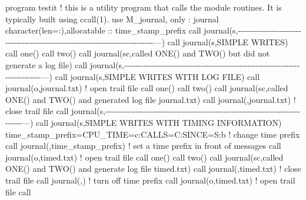 program testit ! this is a utility program that calls the module routines. It is typically built using ccall(1). use M\+\_\+journal, only \+: journal character(len=\+:),allocatable \+:\+: time\+\_\+stamp\+\_\+prefix call journal(\textquotesingle{}s\textquotesingle{},\textquotesingle{}-\/-\/-\/-\/-\/-\/-\/-\/-\/-\/-\/-\/-\/-\/-\/-\/-\/-\/-\/-\/-\/-\/-\/-\/-\/-\/-\/-\/-\/-\/-\/-\/-\/-\/-\/-\/-\/-\/-\/-\/-\/-\/-\/-\/-\/-\/-\/-\/-\/-\/-\/-\/-\/-\/-\/-\/-\/-\/-\/-\/-\/-\/-\/-\/-\/-\/-\/-\/-\/-\/-\/-\/-\/-\/-\/-\/-\/---\textquotesingle{}) call journal(\textquotesingle{}s\textquotesingle{},\textquotesingle{}S\+I\+M\+P\+LE W\+R\+I\+T\+ES\textquotesingle{}) call one() call two() call journal(\textquotesingle{}sc\textquotesingle{},\textquotesingle{}called O\+N\+E() and T\+W\+O() but did not generate a log file\textquotesingle{}) call journal(\textquotesingle{}s\textquotesingle{},\textquotesingle{}-\/-\/-\/-\/-\/-\/-\/-\/-\/-\/-\/-\/-\/-\/-\/-\/-\/-\/-\/-\/-\/-\/-\/-\/-\/-\/-\/-\/-\/-\/-\/-\/-\/-\/-\/-\/-\/-\/-\/-\/-\/-\/-\/-\/-\/-\/-\/-\/-\/-\/-\/-\/-\/-\/-\/-\/-\/-\/-\/-\/-\/-\/-\/-\/-\/-\/-\/-\/-\/-\/-\/-\/-\/-\/-\/-\/-\/---\textquotesingle{}) call journal(\textquotesingle{}s\textquotesingle{},\textquotesingle{}S\+I\+M\+P\+LE W\+R\+I\+T\+ES W\+I\+TH L\+OG F\+I\+LE\textquotesingle{}) call journal(\textquotesingle{}o\textquotesingle{},\textquotesingle{}journal.\+txt\textquotesingle{}) ! open trail file call one() call two() call journal(\textquotesingle{}sc\textquotesingle{},\textquotesingle{}called O\+N\+E() and T\+W\+O() and generated log file journal.\+txt\textquotesingle{}) call journal(\textquotesingle{}\textquotesingle{},\textquotesingle{}journal.\+txt\textquotesingle{}) ! close trail file call journal(\textquotesingle{}s\textquotesingle{},\textquotesingle{}-\/-\/-\/-\/-\/-\/-\/-\/-\/-\/-\/-\/-\/-\/-\/-\/-\/-\/-\/-\/-\/-\/-\/-\/-\/-\/-\/-\/-\/-\/-\/-\/-\/-\/-\/-\/-\/-\/-\/-\/-\/-\/-\/-\/-\/-\/-\/-\/-\/-\/-\/-\/-\/-\/-\/-\/-\/-\/-\/-\/-\/-\/-\/-\/-\/-\/-\/-\/-\/-\/-\/-\/-\/-\/-\/-\/-\/---\textquotesingle{}) call journal(\textquotesingle{}s\textquotesingle{},\textquotesingle{}S\+I\+M\+P\+LE W\+R\+I\+T\+ES W\+I\+TH T\+I\+M\+I\+NG I\+N\+F\+O\+R\+M\+A\+T\+I\+ON\textquotesingle{}) time\+\_\+stamp\+\_\+prefix=\textquotesingle{}C\+P\+U\+\_\+\+T\+I\+ME=c\+:C\+A\+L\+LS=C\+:S\+I\+N\+CE=S\+:b\textquotesingle{} ! change time prefix call journal(\textquotesingle{}\textquotesingle{},time\+\_\+stamp\+\_\+prefix) ! set a time prefix in front of messages call journal(\textquotesingle{}o\textquotesingle{},\textquotesingle{}timed.\+txt\textquotesingle{}) ! open trail file call one() call two() call journal(\textquotesingle{}sc\textquotesingle{},\textquotesingle{}called O\+N\+E() and T\+W\+O() and generate log file timed.\+txt\textquotesingle{}) call journal(\textquotesingle{}\textquotesingle{},\textquotesingle{}timed.\+txt\textquotesingle{}) ! close trail file call journal(\textquotesingle{}\textquotesingle{},\textquotesingle{}\textquotesingle{}) ! turn off time prefix call journal(\textquotesingle{}o\textquotesingle{},\textquotesingle{}timed.\+txt\textquotesingle{}) ! open trail file call 